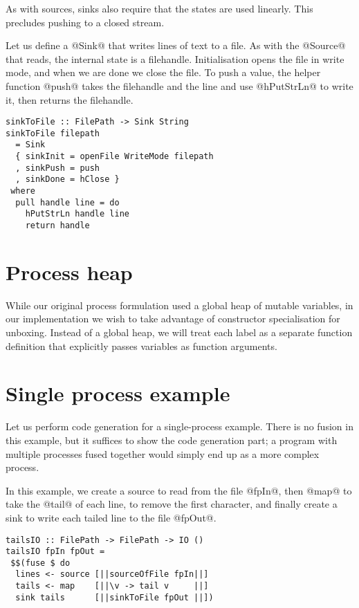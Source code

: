As with sources, sinks also require that the states are used linearly.
This precludes pushing to a closed stream.

Let us define a @Sink@ that writes lines of text to a file.
As with the @Source@ that reads, the internal state is a filehandle.
Initialisation opens the file in write mode, and when we are done we close the file.
To push a value, the helper function @push@ takes the filehandle and the line and use @hPutStrLn@ to write it, then returns the filehandle.

\begin{lstlisting}
sinkToFile :: FilePath -> Sink String
sinkToFile filepath
  = Sink
  { sinkInit = openFile WriteMode filepath
  , sinkPush = push
  , sinkDone = hClose }
 where
  pull handle line = do
    hPutStrLn handle line
    return handle
\end{lstlisting}


\section{Process heap}
While our original process formulation  used a global heap of mutable variables, in our implementation we wish to take advantage of constructor specialisation for unboxing.
Instead of a global heap, we will treat each label as a separate function definition that explicitly passes variables as function arguments.


\section{Single process example}
Let us perform code generation for a single-process example.
There is no fusion in this example, but it suffices to show the code generation part; a program with multiple processes fused together would simply end up as a more complex process.

In this example, we create a source to read from the file @fpIn@, then @map@ to take the @tail@ of each line, to remove the first character, and finally create a sink to write each tailed line to the file @fpOut@.

\begin{lstlisting}
tailsIO :: FilePath -> FilePath -> IO ()
tailsIO fpIn fpOut =
 $$(fuse $ do
  lines <- source [||sourceOfFile fpIn||]
  tails <- map    [||\v -> tail v     ||]
  sink tails      [||sinkToFile fpOut ||])
\end{lstlisting}

